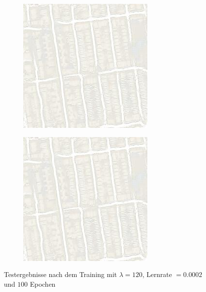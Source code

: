 \begin{figure}[ht]
\begin{subfigure}[t]{.14\textwidth}
  \end{subfigure}
  \begin{subfigure}[t]{.14\textwidth}
    \centering
    \includegraphics[width=\linewidth]{images/cycleGanResults/Maps19Ld120_E100_Lr0002.jpg}
  \end{subfigure}
  \begin{subfigure}[t]{.14\textwidth}
    \centering
    \includegraphics[width=\linewidth]{images/cycleGanResults/Maps19Ld120_E100_Lr0002.jpg}
  \end{subfigure}
  \caption{Testergebnisse nach dem Training mit $\lambda=120$, Lernrate $=0.0002$ und $100$ Epochen}
  \label{evaluation:cycleGan_Testergebnisse}
\end{figure}

